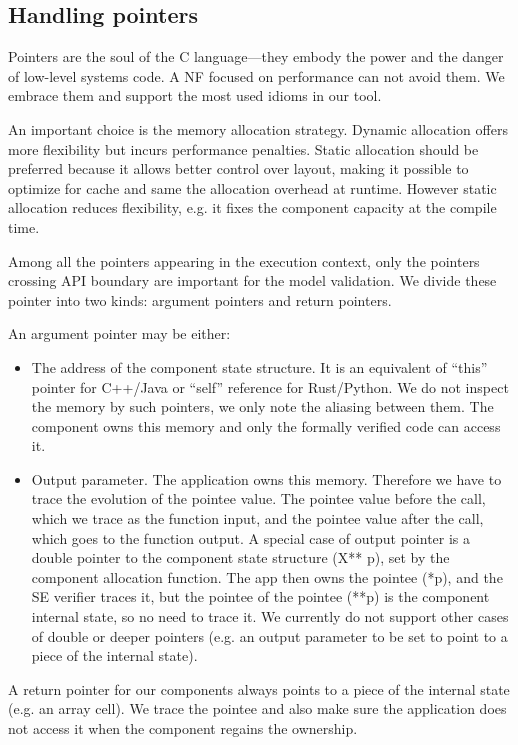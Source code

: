 \documentclass[letterpaper,twocolumn,10pt]{article}
\begin{document}
\subsection{Handling pointers}
\label{sec:handling-pointers}

Pointers are the soul of the C language---they embody the power and the danger
of low-level systems code. A NF focused on performance can not avoid them. We
embrace them and support the most used idioms in our tool.

An important choice is the memory allocation strategy. Dynamic allocation offers
more flexibility but incurs performance penalties. Static allocation should be
preferred because it allows better control over layout, making it possible to
optimize for cache and same the allocation overhead at runtime. However static
allocation reduces flexibility, e.g. it fixes the component capacity at the
compile time.

Among all the pointers appearing in the execution context, only the pointers
crossing API boundary are important for the model validation. We divide these
pointer into two kinds: argument pointers and return pointers.

An argument pointer may be either:
\begin{itemize}
\item The address of the component state structure. It is an equivalent of
  ``this'' pointer for C++/Java or ``self'' reference for Rust/Python. We do not
  inspect the memory by such pointers, we only note the aliasing between them.
  The component owns this memory and only the formally verified code can access
  it.
\item Output parameter. The application owns this memory. Therefore we have to
  trace the evolution of the pointee value. The pointee value before the call,
  which we trace as the function input, and the pointee value after the call,
  which goes to the function output. A special case of output pointer is a
  double pointer to the component state structure (X** p), set by the component
  allocation function. The app then owns the pointee (*p), and the SE verifier
  traces it, but the pointee of the pointee (**p) is the component internal
  state, so no need to trace it. We currently do not support other cases of
  double or deeper pointers (e.g. an output parameter to be set to point to a
  piece of the internal state).
\end{itemize}

A return pointer for our components always points to a piece of the internal
state (e.g. an array cell). We trace the pointee and also make sure the
application does not access it when the component regains the ownership.
\end{document}
